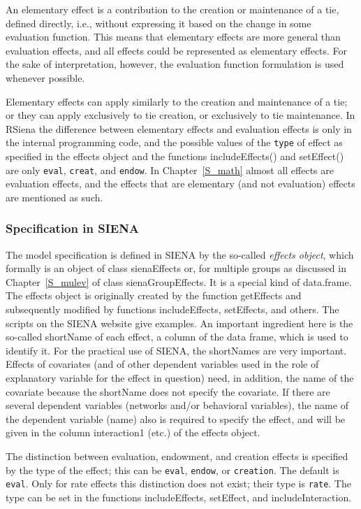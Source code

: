 \documentclass[a4paper,fleqn,11pt]{article}
\newcommand{\+}{\, + \,}
\newcommand{\sfn}[1]{\textsf{#1}}
\newcommand{\RS}{{\sf RSiena }}
\newcommand{\SI}{{\sf SIENA }}
\newcommand{\si}{{\sf SIENA}}
\begin{document}
An elementary effect is a contribution to the creation or maintenance of a tie,
defined directly, i.e., without expressing it based on the
change in some evaluation function.
This means that elementary effects are more general than
evaluation effects, and all effects could be represented as elementary effects.
For the sake of interpretation, however, the evaluation function formulation
is used whenever possible.

Elementary effects can apply similarly to the creation and maintenance of a tie;
or they can apply exclusively to tie creation, or exclusively to tie
maintenance. In \RS the difference between elementary effects and evaluation effects
is only in the internal programming code, and the
possible values of the \texttt{type} of effect
as specified in the effects object and the
functions \sfn{includeEffects()} and \sfn{setEffect()}
are only \texttt{eval}, \texttt{creat}, and \texttt{endow}.
In Chapter~\ref{S_math} almost all effects are evaluation effects,
and the effects that are elementary (and not evaluation) effects
are mentioned as such.

\subsubsection{Specification in \SI}

The model specification is defined in \SI by the so-called
\emph{effects object}, which formally is an object of class
\sfn{sienaEffects} or, for multiple groups as discussed in Chapter~\ref{S_mulev}
of class \sfn{sienaGroupEffects}.
It is a special kind of \sfn{data.frame}.
The effects object is originally created by the function \sfn{getEffects} and
subsequently modified by functions \sfn{includeEffects},
\sfn{setEffects}, and others.
The scripts on the \SI website give examples.
An important ingredient here is the so-called \sfn{shortName}
of each effect, a column of the data frame, which is used to identify it.
For the practical use of \si, the \sfn{shortName}s are very important.
Effects of covariates (and of other dependent variables used in
the role of explanatory variable for the effect in question)
need, in addition, the name of the covariate
because the \sfn{shortName} does not specify the covariate.
If there are several dependent variables (networks and/or behavioral variables),
the name of the dependent variable (\sfn{name}) also is required
to specify the effect, and will be given in the column \sfn{interaction1}
(etc.) of the effects object.

The distinction between evaluation, endowment, and creation effects is
specified by the \sfn{type} of the effect; this can be
\texttt{eval}, \texttt{endow}, or \texttt{creation}.
The default is \texttt{eval}.
Only for rate effects this distinction does not exist;
their \sfn{type} is \texttt{rate}.
The \sfn{type} can be set in the functions \sfn{includeEffects},
\sfn{setEffect}, and \sfn{includeInteraction}.
\end{document}
